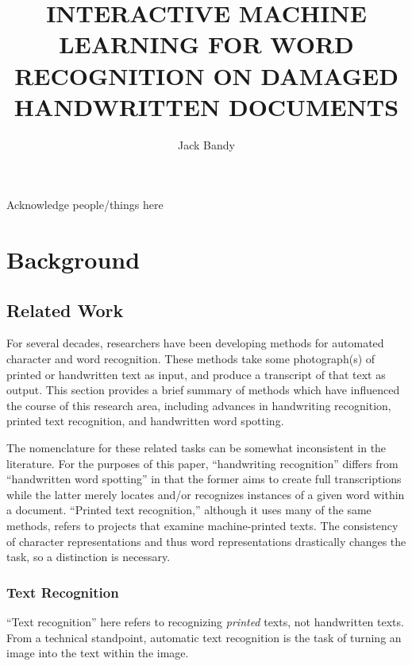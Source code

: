 \documentclass[final]{ukthesis}
\begin{document}
\author{Jack Bandy}
\title{INTERACTIVE MACHINE LEARNING FOR WORD RECOGNITION ON DAMAGED HANDWRITTEN DOCUMENTS}
\frontmatter
\maketitle
\begin{acknowledgments}
Acknowledge people/things here
\end{acknowledgments}
\tableofcontents\clearpage
\listoffigures\clearpage
\listoftables\clearpage
\mainmatter


%
%
%
\chapter{Background}


%
%
\section{Related Work}
For several decades, researchers have been developing methods for automated character and word recognition. These methods take some photograph(s) of printed or handwritten text as input, and produce a transcript of that text as output. This section provides a brief summary of methods which have influenced the course of this research area, including advances in handwriting recognition, printed text recognition, and handwritten word spotting.

The nomenclature for these related tasks can be somewhat inconsistent in the literature. For the purposes of this paper, ``handwriting recognition'' differs from ``handwritten word spotting'' in that the former aims to create full transcriptions while the latter merely locates and/or recognizes instances of a given word within a document. ``Printed text recognition,'' although it uses many of the same methods, refers to projects that examine machine-printed texts. The consistency of character representations and thus word representations drastically changes the task, so a distinction is necessary.

\subsection{Text Recognition}
``Text recognition'' here refers to recognizing {\em printed} texts, not handwritten texts. From a technical standpoint, automatic text recognition is the task of turning an image into the text within the image.
\end{document}
